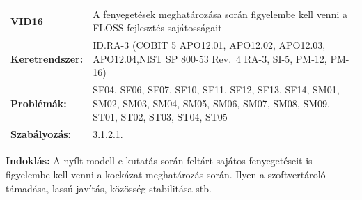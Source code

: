 \documentclass[12pt,magyar,a4paper,oneside]{scrreprt}
\begin{document}
\begin{longtable}[]{@{}ll@{}}
\toprule
\endhead
\begin{minipage}[t]{0.16\columnwidth}\raggedright
\textbf{VID16}\strut
\end{minipage} & \begin{minipage}[t]{0.79\columnwidth}\raggedright
A fenyegetések meghatározása során figyelembe kell venni a FLOSS
fejlesztés sajátosságait\strut
\end{minipage}\tabularnewline
\begin{minipage}[t]{0.16\columnwidth}\raggedright
\textbf{Keretrendszer:}\strut
\end{minipage} & \begin{minipage}[t]{0.79\columnwidth}\raggedright
ID.RA-3 (COBIT 5 APO12.01, APO12.02, APO12.03, APO12.04,NIST SP 800-53
Rev.~4 RA-3, SI-5, PM-12, PM-16)\strut
\end{minipage}\tabularnewline
\begin{minipage}[t]{0.16\columnwidth}\raggedright
\textbf{Problémák:}\strut
\end{minipage} & \begin{minipage}[t]{0.79\columnwidth}\raggedright
SF04, SF06, SF07, SF10, SF11, SF12, SF13, SF14, SM01, SM02, SM03, SM04,
SM05, SM06, SM07, SM08, SM09, ST01, ST02, ST03, ST04, ST05\strut
\end{minipage}\tabularnewline
\begin{minipage}[t]{0.16\columnwidth}\raggedright
\textbf{Szabályozás:}\strut
\end{minipage} & \begin{minipage}[t]{0.79\columnwidth}\raggedright
3.1.2.1.\strut
\end{minipage}\tabularnewline
\bottomrule
\end{longtable}

\textbf{Indoklás: } A nyílt modell e kutatás során feltárt sajátos
fenyegetéseit is figyelembe kell venni a kockázat-meghatározás során.
Ilyen a szoftvertároló támadása, lassú javítás, közösség stabilitása
stb.
\end{document}
